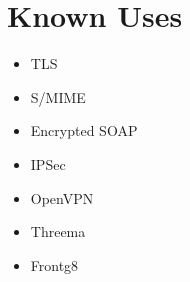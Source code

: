 \section{Known Uses}
\begin{itemize}
  \item TLS
  \item S/MIME
  \item Encrypted SOAP
  \item IPSec
  \item OpenVPN
  \item Threema
  \item Frontg8
\end{itemize}

